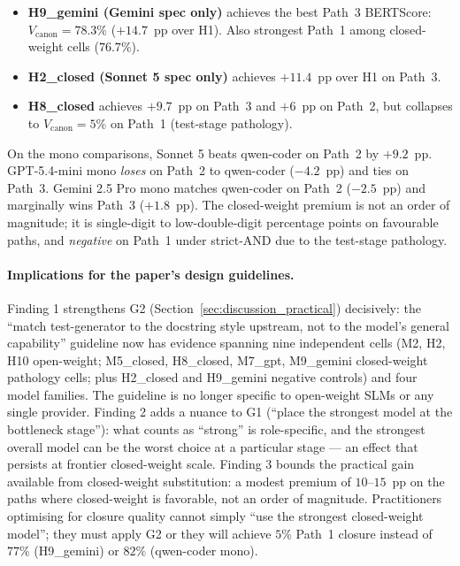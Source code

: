 \begin{itemize}
  \item \textbf{H9\_gemini (Gemini spec only)} achieves the best Path~3 BERTScore: $V_{\text{canon}} = 78.3\%$ ($+14.7$~pp over H1). Also strongest Path~1 among closed-weight cells ($76.7\%$).
  \item \textbf{H2\_closed (Sonnet 5 spec only)} achieves $+11.4$~pp over H1 on Path~3.
  \item \textbf{H8\_closed} achieves $+9.7$~pp on Path~3 and $+6$~pp on Path~2, but collapses to $V_{\text{canon}} = 5\%$ on Path~1 (test-stage pathology).
\end{itemize}

On the mono comparisons, Sonnet 5 beats qwen-coder on Path~2 by $+9.2$~pp. GPT-5.4-mini mono \emph{loses} on Path~2 to qwen-coder ($-4.2$~pp) and ties on Path~3. Gemini 2.5 Pro mono matches qwen-coder on Path~2 ($-2.5$~pp) and marginally wins Path~3 ($+1.8$~pp). The closed-weight premium is not an order of magnitude; it is single-digit to low-double-digit percentage points on favourable paths, and \emph{negative} on Path~1 under strict-AND due to the test-stage pathology.

\paragraph{Implications for the paper's design guidelines.}
Finding 1 strengthens G2 (Section~\ref{sec:discussion_practical}) decisively: the ``match test-generator to the docstring style upstream, not to the model's general capability'' guideline now has evidence spanning nine independent cells (M2, H2, H10 open-weight; M5\_closed, H8\_closed, M7\_gpt, M9\_gemini closed-weight pathology cells; plus H2\_closed and H9\_gemini negative controls) and four model families. The guideline is no longer specific to open-weight SLMs or any single provider. Finding 2 adds a nuance to G1 (``place the strongest model at the bottleneck stage''): what counts as ``strong'' is role-specific, and the strongest overall model can be the worst choice at a particular stage --- an effect that persists at frontier closed-weight scale. Finding 3 bounds the practical gain available from closed-weight substitution: a modest premium of $10$--$15$~pp on the paths where closed-weight is favorable, not an order of magnitude. Practitioners optimising for closure quality cannot simply ``use the strongest closed-weight model''; they must apply G2 or they will achieve $5\%$ Path~1 closure instead of $77\%$ (H9\_gemini) or $82\%$ (qwen-coder mono).

